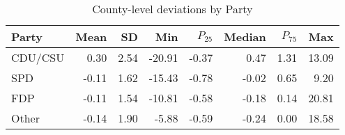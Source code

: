 \begin{table}

\caption{County-level deviations by Party}
\centering
\begin{tabular}[t]{lrrrrrrr}
\toprule
Party & Mean & SD & Min & $P_{25}$ & Median & $P_{75}$ & Max\\
\midrule
CDU/CSU & 0.30 & 2.54 & -20.91 & -0.37 & 0.47 & 1.31 & 13.09\\
SPD & -0.11 & 1.62 & -15.43 & -0.78 & -0.02 & 0.65 & 9.20\\
FDP & -0.11 & 1.54 & -10.81 & -0.58 & -0.18 & 0.14 & 20.81\\
Other & -0.14 & 1.90 & -5.88 & -0.59 & -0.24 & 0.00 & 18.58\\
\bottomrule
\end{tabular}
\end{table}
